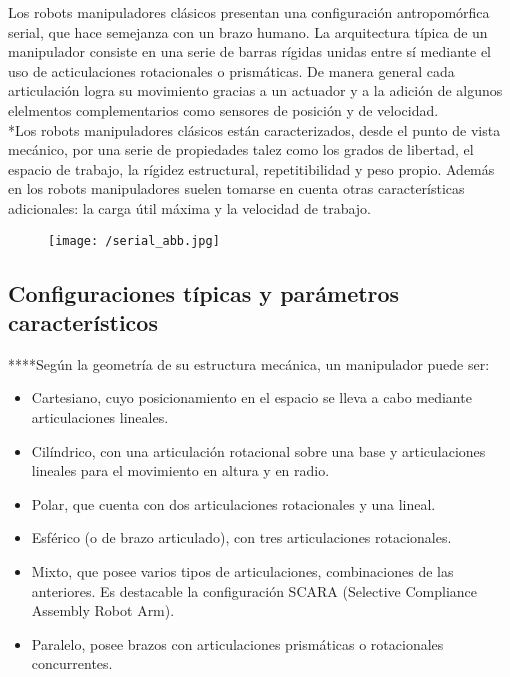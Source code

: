 \documentclass[a4paper, openright, 12pt]{report}
\begin{document}
		Los robots manipuladores clásicos presentan una configuración antropomórfica serial, que hace semejanza con un brazo humano. La arquitectura típica de un manipulador consiste en una serie de barras rígidas unidas entre sí mediante el uso de acticulaciones rotacionales o prismáticas. De manera general cada articulación logra su movimiento gracias a un actuador y a la adición de algunos elelmentos complementarios como sensores de posición y de velocidad\cite{baturone2005}.\\

		*Los robots manipuladores clásicos están caracterizados, desde el punto de vista mecánico, por una serie de propiedades talez como los grados de libertad, el espacio de trabajo, la rígidez estructural, repetitibilidad y peso propio. Además en los robots manipuladores suelen tomarse en cuenta otras características adicionales: la carga útil máxima y la velocidad de trabajo.\\

		\begin{figure}[htb]
			\begin{center}
			\texttt{[image: /serial\_abb.jpg]}
			\end{center}
		\end{figure}

		\subsection{Configuraciones típicas y parámetros característicos}
			****Según la geometría de su estructura mecánica, un manipulador puede ser:

			\begin{itemize}
				\item{Cartesiano, cuyo posicionamiento en el espacio se lleva a cabo mediante articulaciones lineales.}

				\item{Cilíndrico, con una articulación rotacional sobre una base y articulaciones lineales para el movimiento en altura y en radio.}

				\item{Polar, que cuenta con dos articulaciones rotacionales y una lineal.}

				\item{Esférico (o de brazo articulado), con tres articulaciones rotacionales.}

				\item{Mixto, que posee varios tipos de articulaciones, combinaciones de las anteriores. Es destacable la configuración SCARA (Selective Compliance Assembly Robot Arm).}

				\item{Paralelo, posee brazos con articulaciones prismáticas o rotacionales concurrentes.}
			\end{itemize}
\end{document}
